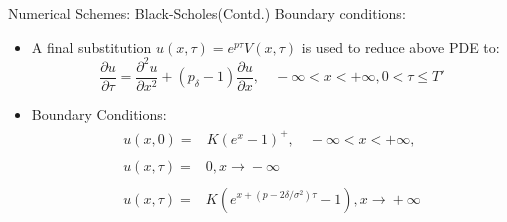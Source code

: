 \documentclass{beamer}
\begin{document}
\begin{frame}{Numerical Schemes: Black-Scholes(Contd.)}
Boundary conditions:
\begin{itemize}
    \item A final substitution $u(x, \tau)=e^{p\tau}V(x, \tau)$ is used to reduce above PDE to:
\begin{equation*}
    \frac{\partial u}{\partial \tau} = \frac{\partial^{2} u}{\partial x^{2}} + (p_{\delta}-1)\frac{\partial u}{\partial x}, \quad -\infty < x< +\infty, 0 < \tau \le T'
\end{equation*}
\item Boundary Conditions: \begin{align*}
    \begin{split}
        u(x,0) ={}& K(e^{x}-1)^{+}, \quad -\infty <x < +\infty,
    \end{split}\\
    \begin{split}
        u(x,\tau) ={}& 0, x \xrightarrow{} -\infty
    \end{split}\\
    \begin{split}
        u(x,\tau) ={}& K(e^{x+(p-2\delta/\sigma^{2})\tau}-1), x \xrightarrow{} +\infty
    \end{split}
\end{align*}
    \end{itemize}
\end{frame}
 
\end{document}
